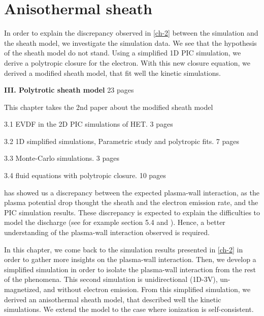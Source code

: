 



\chapter{Anisothermal sheath}
\label{ch-3}

In order to explain the discrepancy observed in \cref{ch-2} between the simulation and the sheath model, we investigate the simulation data.
We see that the hypothesis of the sheath model do not stand.
Using a simplified \ac{1D} \ac{PIC} simulation, we derive a polytropic closure for the electron.
With this new closure equation, we derived a modified sheath model, that fit well the kinetic simulations. 


{\bf III. Polytrotic sheath model} 23 pages
\begin{zzz}
  This chapter takes the 2nd paper about the modified sheath model

  3.1 EVDF in the 2D PIC simulations of HET.    3 pages

  3.2 1D simplified simulations, Parametric study and polytropic fits. 7 pages

  3.3 Monte-Carlo simulations.  3 pages

  3.4 fluid equations with polytropic closure. 10 pages
\end{zzz}


\minitoc

 has showed us a discrepancy between the expected plasma-wall interaction, as the plasma potential drop thought the sheath and the electron emission rate, and the \ac{PIC} simulation results.
These discrepancy is expected to explain the difficulties to model the discharge (see for example \citet{croes2017} section 5.4 and \citet{raitses2011}).
Hence, a better understanding of the plasma-wall interaction observed is required.

In this chapter, we come back to the simulation results presented in \cref{ch-2}  in order to gather more insights on the plasma-wall interaction.
Then, we develop a simplified simulation in order to isolate the plasma-wall interaction from the rest of the phenomena.
This second simulation is unidirectional (\acs{1D}-\acs{3V}), un-magnetized, and without electron emission.
From this simplified simulation, we derived an anisothermal sheath model, that described well the kinetic simulations.
We extend the model to the case where ionization is self-consistent.




